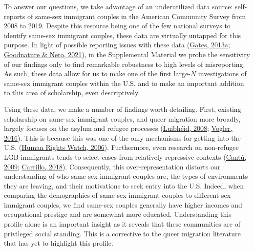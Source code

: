 \documentclass[
  11pt,
]{article}
\begin{document}
To answer our questions, we take advantage of an underutilized data source: self-reports of same-sex immigrant couples in the American Community Survey from 2008 to 2019. Despite this resource being one of the few national surveys to identify same-sex immigrant couples, these data are virtually untapped for this purpose. In light of possible reporting issues with these data (\protect\hyperlink{ref-gates_2013}{Gates, 2013a}; \protect\hyperlink{ref-goodnature_2021}{Goodnature \& Neto, 2021}), in the Supplemental Material we probe the sensitivity of our findings only to find remarkable robustness to high levels of misreporting. As such, these data allow for us to make one of the first large-\(N\) investigations of same-sex immigrant couples within the U.S. and to make an important addition to this area of scholarship, even descriptively.

Using these data, we make a number of findings worth detailing. First, existing scholarship on same-sex immigrant couples, and queer migration more broadly, largely focuses on the asylum and refugee processes (\protect\hyperlink{ref-luibheid_2008}{Luibhéid, 2008}; \protect\hyperlink{ref-vogler_2016}{Vogler, 2016}). This is because this was one of the only mechanisms for getting into the U.S. (\protect\hyperlink{ref-humanrightswatch_2006}{Human Rights Watch, 2006}). Furthermore, even research on non-refugee LGB immigrants tends to select cases from relatively repressive contexts (\protect\hyperlink{ref-cantu_2009}{Cantú, 2009}; \protect\hyperlink{ref-carrillo_2018}{Carrillo, 2018}). Consequently, this over-representation distorts our understanding of who same-sex immigrant couples are, the types of environments they are leaving, and their motivations to seek entry into the U.S. Indeed, when comparing the demographics of same-sex immigrant couples to different-sex immigrant couples, we find same-sex couples generally have higher incomes and occupational prestige and are somewhat more educated. Understanding this profile alone is an important insight as it reveals that these communities are of privileged social standing. This is a corrective to the queer migration literature that has yet to highlight this profile.
\end{document}
